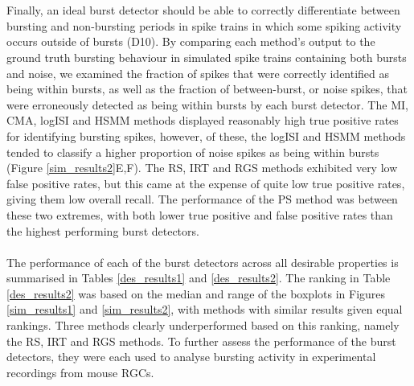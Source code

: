 \documentclass[12pt, titlepage]{article}
\begin{document}
	\\ \\ Finally, an ideal burst detector should be able to correctly differentiate between bursting and non-bursting periods in spike trains in which some spiking activity occurs outside of bursts (D10). By comparing each method's output to the ground truth bursting behaviour in simulated spike trains containing both bursts and noise, we examined the fraction of spikes that were correctly identified as being within bursts, as well as the fraction of between-burst, or noise spikes, that were erroneously detected as being within bursts by each burst detector.
	The MI, CMA, logISI and HSMM methods displayed reasonably high true positive rates for identifying bursting spikes, however, of these, the logISI and HSMM methods tended to classify a higher proportion of noise spikes as being within bursts (Figure \ref{sim_results2}E,F). The RS, IRT and RGS methods exhibited very low false positive rates, but this came at the expense of quite low true positive rates, giving them low overall recall. The performance of the PS method was between these two extremes, with both lower true positive and false positive rates than the highest performing burst detectors.
	\\ \\ The performance of each of the burst detectors across all desirable properties is summarised in Tables \ref{des_results1} and \ref{des_results2}. The ranking in Table \ref{des_results2} was based on the median and range of the boxplots in Figures \ref{sim_results1} and \ref{sim_results2}, with methods with similar results given equal rankings. Three methods clearly underperformed based on this ranking, namely the RS, IRT and RGS methods. To further assess the performance of the burst detectors, they were each used to analyse bursting activity in experimental recordings from mouse RGCs.
\end{document}
